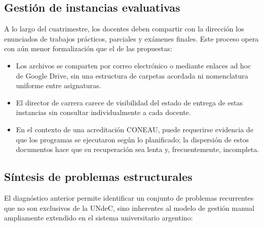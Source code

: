 \subsection{Gestión de instancias evaluativas}
\label{subsec:evaluativas_asis}

A lo largo del cuatrimestre, los docentes deben compartir con la dirección los enunciados de trabajos prácticos, parciales y exámenes finales. Este proceso opera con aún menor formalización que el de las propuestas:

\begin{itemize}
    \item Los archivos se comparten por correo electrónico o mediante enlaces ad hoc de Google Drive, sin una estructura de carpetas acordada ni nomenclatura uniforme entre asignaturas.

    \item El director de carrera carece de visibilidad del estado de entrega de estas instancias sin consultar individualmente a cada docente.

    \item En el contexto de una acreditación CONEAU, puede requerirse evidencia de que los programas se ejecutaron según lo planificado; la dispersión de estos documentos hace que su recuperación sea lenta y, frecuentemente, incompleta.
\end{itemize}

\subsection{Síntesis de problemas estructurales}
\label{subsec:problemas_asis}

El diagnóstico anterior permite identificar un conjunto de problemas recurrentes que no son exclusivos de la UNdeC, sino inherentes al modelo de gestión manual ampliamente extendido en el sistema universitario argentino:

